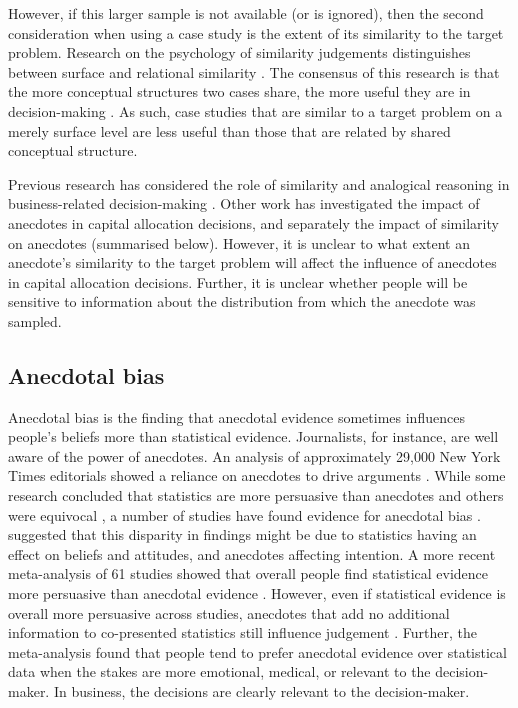 \documentclass[a4paper, nobind, dvipsnames]{templates/ociamthesis}
\theoremstyle{definition}
\theoremstyle{definition}
\theoremstyle{definition}
\theoremstyle{definition}
\theoremstyle{remark}
\begin{document}
However, if this larger sample is not available (or is ignored), then the second
consideration when using a case study is the extent of its similarity to the
target problem. Research on the psychology of similarity judgements
distinguishes between surface and relational similarity \autocite{gentner1983}. The
consensus of this research is that the more conceptual structures two cases
share, the more useful they are in decision-making \autocite{markman1995,lassaline1996}. As such, case studies that are similar to a target problem on a
merely surface level are less useful than those that are related by shared
conceptual structure.

Previous research has considered the role of similarity and analogical reasoning
in business-related decision-making \autocite[e.g.,][]{gavetti2005}. Other work has
investigated the impact of anecdotes in capital allocation decisions, and
separately the impact of similarity on anecdotes (summarised below). However, it
is unclear to what extent an anecdote's similarity to the target problem will
affect the influence of anecdotes in capital allocation decisions. Further, it
is unclear whether people will be sensitive to information about the
distribution from which the anecdote was sampled.

\subsection{Anecdotal bias}

Anecdotal bias is the finding that anecdotal evidence sometimes influences
people's beliefs more than statistical evidence. Journalists, for instance, are
well aware of the power of anecdotes. An analysis of approximately 29,000 New
York Times editorials showed a reliance on anecdotes to drive arguments
\autocite{alkhatib2017}. While some research concluded that statistics are more
persuasive than anecdotes \autocites[e.g.,][]{allen1997,hornikx2005,hoeken2001} and
others were equivocal \autocite{winterbottom2008}, a number of studies have found
evidence for anecdotal bias \autocites[e.g.,][]{reinard1988,shen2015,jaramillo2019,ratcliff2020,reinhart2006}. \textcite{zebregs2015} suggested that this disparity in
findings might be due to statistics having an effect on beliefs and attitudes,
and anecdotes affecting intention. A more recent meta-analysis of 61 studies
showed that overall people find statistical evidence more persuasive than
anecdotal evidence \autocite{freling2020}. However, even if statistical evidence is
overall more persuasive across studies, anecdotes that add no additional
information to co-presented statistics still influence judgement
\autocite{jaramillo2019}. Further, the meta-analysis found that people tend to prefer
anecdotal evidence over statistical data when the stakes are more emotional,
medical, or relevant to the decision-maker. In business, the decisions are
clearly relevant to the decision-maker.
\end{document}

